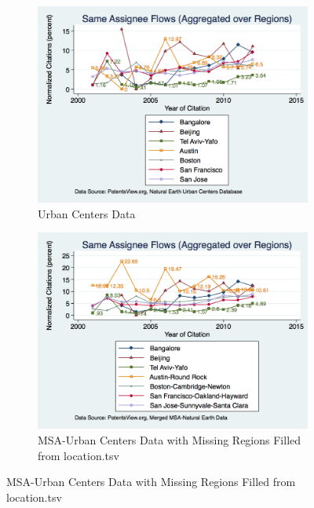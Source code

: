\documentclass[12pt]{article}
\begin{document}
\begin{figure}
  \begin{subfigure}[b]{\textwidth}
    \includegraphics[width=\textwidth]{UCSameAssigneeFlows}
    \caption{Urban Centers Data}
    \label{fig:UCSameAssigneeFlows}
  \end{subfigure}
  
  \begin{subfigure}[b]{\textwidth}
    \includegraphics[width=\textwidth]{SameAssigneeFlows}
    \caption{MSA-Urban Centers Data with Missing Regions Filled from location.tsv}
    \label{fig:SameAssigneeFlows}
  \end{subfigure}
\end{figure}
\end{document}
